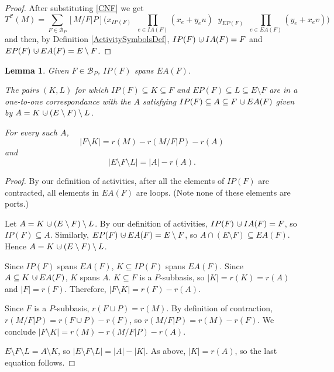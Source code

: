 \documentclass[12pt,leqno]{amsart}
\newtheorem{lem}{Lemma}
\theoremstyle{remark}
\newcommand{\dunion}
{\mbox{\hbox{\hskip6pt$\cdot$\hskip-5.50pt$\cup$\hskip2pt}}}
\newcommand{\Card}[1]{\ensuremath{{\left|#1\right|}}}
\begin{document}
\begin{proof} After substituting \eqref{CNF} we get
\[
T^{\mathcal{C}}(M)=
\sum_{F\in \mathcal{B}_P}[M/F|P]
\Big(
x_{IP(F)}\;\;
\prod_{e\in IA(F)}\left(x_e+y_eu\right)\;\;
y_{EP(F)}\;\;
\prod_{e\in EA(F)}\left(y_e+x_ev\right)
\Big)
\]
and then, by Definition \ref{ActivitySymbolsDef}, 
$IP(F)\dunion IA(F) =F$ and 
$EP(F)\dunion EA(F)=E\setminus F$.
 \end{proof}


\begin{lem}
\label{KLAlemma}
Given $F\in\mathcal{B}_P$,
$IP(F)$ spans $EA(F)$.

The pairs $(K,L)$ for which 
       $IP(F)\subseteq K \subseteq F$ and 
       $EP(F)\subseteq L \subseteq E\setminus F$
are in a one-to-one correspondance
with the $A$ satisfying $IP(F)\subseteq A\subseteq F\dunion EA(F)$
given by $A=K\dunion (E\setminus F)\setminus L$.


For every such $A$, 
\begin{equation}
\Card{F\setminus K}=r(M)-r(M/F|P)-r(A)
\end{equation}
and
\begin{equation}
\Card{E\setminus F\setminus L} = \Card{A}-r(A).
\end{equation}
\end{lem}

\begin{proof}
By our definition of activities,
after all the elements of $IP(F)$ are contracted, all elements 
in $EA(F)$ are loops.
(Note none of these elements are ports.)

Let 
$A=K\dunion (E\setminus F)\setminus L$.
By our definition of activities,
$IP(F)\dunion IA(F)=F$, so $IP(F)\subseteq A$.
Similarly,  
$EP(F)\dunion EA(F)=E\setminus F$, so 
$A\cap(E\setminus F)\subseteq EA(F)$.
Hence $A=K\dunion (E\setminus F)\setminus L$.

Since $IP(F)$ spans $EA(F)$, $K\subseteq IP(F)$ spans
$EA(F)$.  Since $A\subseteq K\dunion EA(F)$, $K$ spans $A$.
$K\subseteq F$ is a $P$-subbasis, so $\Card{K}=r(K)=r(A)$
and $\Card{F}=r(F)$.  Therefore, $\Card{F\setminus K}=r(F)-r(A)$.

Since $F$ is a $P$-subbasis, $r(F\cup P)=r(M)$.
By definition of contraction, $r(M/F|P)=r(F\cup P) - r(F)$,
so $r(M/F|P)=r(M)-r(F)$.  We conclude 
$\Card{F\setminus K}=r(M)-r(M/F|P)-r(A)$.

$E\setminus F\setminus L = A\setminus K$, so
$\Card{E\setminus F\setminus L} = \Card{A}-\Card{K}$.
As above, $\Card{K}=r(A)$, so the last equation follows.
\end{proof}
\end{document}
